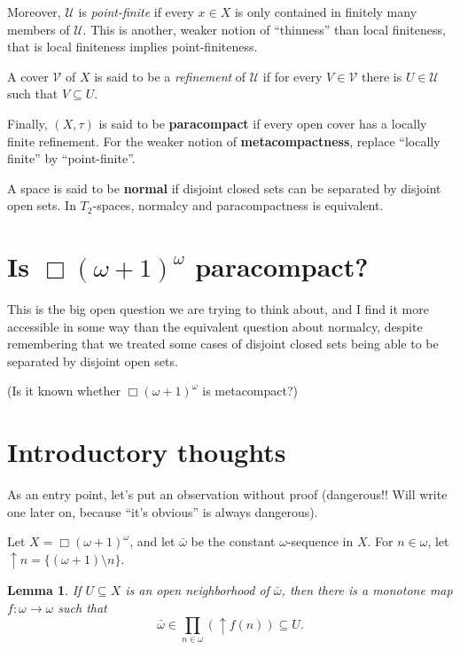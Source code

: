 \documentclass[12pt, a4paper]{amsart}
\newtheorem{lemma}{\bf Lemma}[section]
\begin{document}
Moreover, $\mathcal U$ is {\em point-finite} if every $x\in X$ 
is only contained in finitely many members of $\mathcal U$. This is another, 
weaker notion of ``thinness'' than local finiteness, that is local finiteness 
implies point-finiteness.

A cover ${\mathcal V}$ of $X$ is
said to be a {\em refinement} of ${\mathcal U}$ if for every $V\in {\mathcal V}$
there is $U\in {\mathcal U}$ such that $V\subseteq U$.

Finally, $(X,\tau)$ is said to be {\bf paracompact} if every open cover 
has a locally finite refinement. For the weaker notion of {\bf metacompactness}, 
replace ``locally finite'' by ``point-finite''. 

A space is said to be {\bf normal} if disjoint closed sets can be separated 
by disjoint open sets. In $T_2$-spaces, normalcy and paracompactness is equivalent.

\section{Is $\Box(\omega+1)^\omega$ paracompact?}
This is the big open question we are trying to think about, and I find it
more accessible in some way than the equivalent question about normalcy, despite 
remembering that we treated some cases of disjoint closed sets being able 
to be separated by disjoint open sets.

(Is it known whether $\Box(\omega+1)^\omega$ is metacompact?)

\section{Introductory thoughts}
As an entry point, let's put an observation without proof (dangerous!! Will 
write one later on, because ``it's obvious'' is always dangerous).

Let $X = \Box(\omega+1)^\omega$, and let $\bar{\omega}$ be the constant 
$\omega$-sequence in $X$. For $n\in\omega$, let $\uparrow n = \{(\omega+1)\setminus n\}$. 

\begin{lemma} If $U\subseteq X$ is an open neighborhood of $\bar{\omega}$, 
then there is a {\em monotone map} $f:\omega\to\omega$ such that 
$$\bar{\omega}\in \prod_{n\in\omega}(\uparrow f(n))\subseteq U.$$
\end{lemma}
\end{document}
